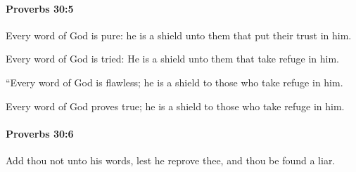 		\paragraph{Proverbs 30:5} %
			\label{PROVERBS-30-5}

			Every word of God is pure: he is a shield unto them that put their trust in him.

			\begin{versebox}
					\item[BHS] 
					\item[ASV] Every word of God is tried: He is a shield unto them that take refuge in him.
					\item[NIV] “Every word of God is flawless; he is a shield to those who take refuge in him.
					\item[NRSV] Every word of God proves true; he is a shield to those who take refuge in him.
			\end{versebox}

		\paragraph{Proverbs 30:6} %
			\label{PROVERBS-30-6}

			Add thou not unto his words, lest he reprove thee, and thou be found a liar.

